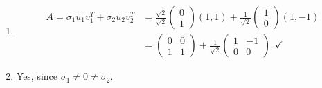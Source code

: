 {\begin{enumerate}
\begin{enumerate}
\begin{itemize}
$$			=\frac{1}{\sqrt{2}}\begin{pmatrix}1&-1\\\sqrt{2}&\sqrt{2}\end{pmatrix}=A~~\checkmark$$
		\end{itemize}
		\item 
		\begin{align*}
		A=\sigma_1u_1v_1^T+\sigma_2u_2v_2^T&=\frac{\sqrt{2}}{\sqrt{2}}\begin{pmatrix}0\\1\end{pmatrix}(1, 1)+\frac{1}{\sqrt{2}}\begin{pmatrix}1\\0\end{pmatrix}(1, -1)\\
		&=\begin{pmatrix}0&0\\1&1\end{pmatrix}+\frac{1}{\sqrt{2}}\begin{pmatrix}1&-1\\0&0\end{pmatrix}~~\checkmark
		\end{align*}
		\item 
		Yes, since $\sigma_1\neq0\neq\sigma_2$.
	\end{enumerate}
\end{enumerate}
}
